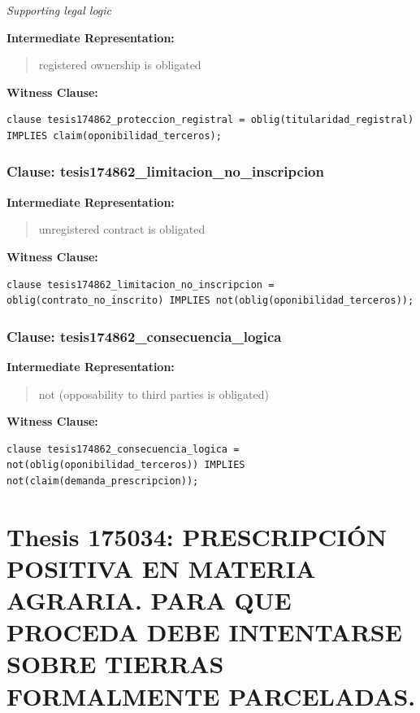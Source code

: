 \documentclass[11pt,a4paper]{article}
\begin{document}
\textit{Supporting legal logic}

\textbf{Intermediate Representation:}

\begin{quote}
registered ownership is obligated
\end{quote}

\textbf{Witness Clause:}

\begin{lstlisting}[style=witnessstyle, language=Witness]
clause tesis174862_proteccion_registral = oblig(titularidad_registral) IMPLIES claim(oponibilidad_terceros);
\end{lstlisting}

\subsubsection{Clause: tesis174862\_limitacion\_no\_inscripcion}

\textbf{Intermediate Representation:}

\begin{quote}
unregistered contract is obligated
\end{quote}

\textbf{Witness Clause:}

\begin{lstlisting}[style=witnessstyle, language=Witness]
clause tesis174862_limitacion_no_inscripcion = oblig(contrato_no_inscrito) IMPLIES not(oblig(oponibilidad_terceros));
\end{lstlisting}

\subsubsection{Clause: tesis174862\_consecuencia\_logica}

\textbf{Intermediate Representation:}

\begin{quote}
not (opposability to third parties is obligated)
\end{quote}

\textbf{Witness Clause:}

\begin{lstlisting}[style=witnessstyle, language=Witness]
clause tesis174862_consecuencia_logica = not(oblig(oponibilidad_terceros)) IMPLIES not(claim(demanda_prescripcion));
\end{lstlisting}

\newpage

\section{Thesis 175034: PRESCRIPCIÓN POSITIVA EN MATERIA AGRARIA. PARA QUE PROCEDA DEBE INTENTARSE SOBRE TIERRAS FORMALMENTE PARCELADAS.}
\label{thesis:175034}
\end{document}
